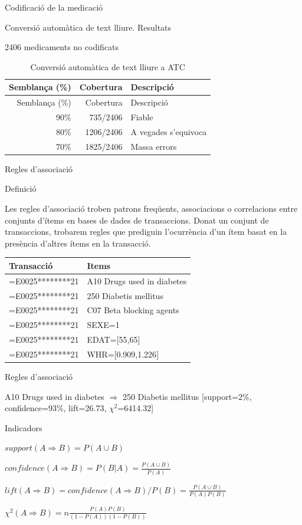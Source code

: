 \documentclass[ignorenonframetext,]{beamer}
\begin{document}
\begin{frame}{Codificació de la medicació}

\begin{block}{Conversió automàtica de text lliure. Resultats}

2406 medicaments no codificats

\begin{longtable}[]{@{}rrl@{}}
\caption{Conversió automàtica de text lliure a ATC}\tabularnewline
\toprule
Semblança (\%) & Cobertura & Descripció\tabularnewline
\midrule
\endfirsthead
\toprule
Semblança (\%) & Cobertura & Descripció\tabularnewline
\midrule
\endhead
90\% & 735/2406 & Fiable\tabularnewline
80\% & 1206/2406 & A vegades s'equivoca\tabularnewline
70\% & 1825/2406 & Massa errors\tabularnewline
\bottomrule
\end{longtable}

\end{block}

\end{frame}

\begin{frame}{Regles d'associació}

\begin{block}{Definició}

Les regles d'associació troben patrons freqüents, associacions o
correlacions entre conjunts d'ítems en bases de dades de transaccions.
Donat un conjunt de transaccions, trobarem regles que prediguin
l'ocurrència d'un ítem basat en la presència d'altres ítems en la
transacció.

\begin{longtable}[]{@{}ll@{}}
\toprule
Transacció & Items\tabularnewline
\midrule
\endhead
=E0025********21 & A10 Drugs used in diabetes\tabularnewline
=E0025********21 & 250 Diabetis mellitus\tabularnewline
=E0025********21 & C07 Beta blocking agents\tabularnewline
=E0025********21 & SEXE=1\tabularnewline
=E0025********21 & EDAT={[}55,65{]}\tabularnewline
=E0025********21 & WHR={[}0.909,1.226{]}\tabularnewline
\bottomrule
\end{longtable}

\end{block}

\end{frame}

\begin{frame}{Regles d'associació}

A10 Drugs used in diabetes \(\Rightarrow\) 250 Diabetis mellitus
{[}support=2\%, confidence=93\%, lift=26.73, \(\chi^2\)=6414.32{]}

\begin{block}{Indicadors}

\(support(A \Rightarrow B) = P(A \cup B)\)

\(confidence(A \Rightarrow B) = P(B|A) = \frac{P(A \cup B)}{P(A)}\)

\(lift(A \Rightarrow B) = confidence(A \Rightarrow B)/P(B) = \frac{P(A \cup B)}{P(A)P(B)}\)

\(\chi^2(A \Rightarrow B) = n\frac{P(A)P(B)}{(1-P(A))(1-P(B))}\)

\end{block}

\end{frame}
\end{document}
